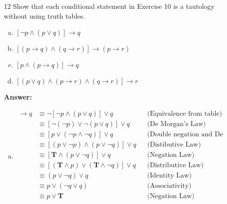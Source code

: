 \begin{itemize}
\begin{enumerate}[a.]
          \end{enumerate}
    \item[12]Show that each conditional statement in Exercise 10 is a tautology without using truth tables.
          \begin{enumerate}[a.]
              \item $[\neg p \land (p \lor q)] \to q$
              \item $[(p \to q) \land (q \to r)] \to (p \to r)$
              \item $[p \land (p \to q)] \to q$
              \item $[(p \lor q) \land (p \to r) \land (q \to r)] \to r$
          \end{enumerate}
          \textbf{Answer:}
          \begin{enumerate}[a.]
              \item \begin{align*}
                        [\neg p \land (p \lor q)] \to q
                         & \equiv \neg[\neg p \land (p \lor q)] \lor q                         &  & \text{(Equivalence from table)}              \\
                         & \equiv [\neg(\neg p) \lor \neg(p \lor q)] \lor q                    &  & \text{(De Morgan's Law)}                     \\
                         & \equiv [p \lor (\neg p \land \neg q)] \lor q                        &  & \text{(Double negation and De Morgan's Law)} \\
                         & \equiv [(p \lor \neg p) \land (p \lor \neg q)] \lor q               &  & \text{(Distibutive Law)}                     \\
                         & \equiv [\mathbf{T} \land (p \lor \neg q)] \lor q                    &  & \text{(Negation Law)}                        \\
                         & \equiv [(\mathbf{T} \land p) \lor (\mathbf{T} \land \neg q)] \lor q &  & \text{(Distributive Law)}                    \\
                         & \equiv (p \lor \neg q) \lor q                                       &  & \text{(Identity Law)}                        \\
                         & \equiv p \lor (\neg q \lor q)                                       &  & \text{(Associativity)}                       \\
                         & \equiv p \lor \mathbf{T}                                            &  & \text{(Negation Law)}                        \\

\end{align*}
\end{enumerate}
\end{itemize}

